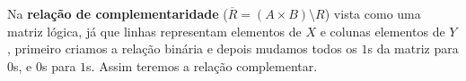         Na \textbf{relação de complementaridade} ($\overline{R} = (A \times B) \setminus R$) vista como uma matriz lógica, já que linhas representam elementos de $X$ e colunas elementos de $Y$, primeiro criamos a relação binária e depois mudamos todos os $1$s da matriz para $0$s, e $0$s para $1$s. Assim teremos a relação complementar.